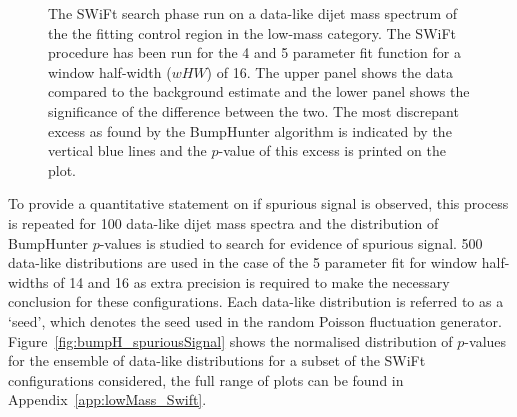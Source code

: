 \begin{figure}[!htb]
\caption{\label{fig:bhFit_lm_corrFitCR_dataLike}
  The SWiFt search phase run on a data-like dijet mass spectrum of the the fitting control region in the low-mass category.
  The SWiFt procedure has been run for the 4 and 5 parameter fit function for a window half-width ($wHW$) of 16.
  The upper panel shows the data compared to the background estimate and the lower panel shows the significance of the difference between the two.
  The most discrepant excess as found by the {\sc BumpHunter} algorithm is indicated by the vertical blue lines and the \mbox{$p$-value} of this excess is printed on the plot. 
}
\end{figure}

To provide a quantitative statement on if spurious signal is observed,
this process is repeated for 100 data-like dijet mass spectra and the distribution of {\sc BumpHunter} \mbox{$p$-value}s is studied to search for evidence of spurious signal.
500 data-like distributions are used in the case of the 5 parameter fit for window half-widths of 14 and 16
as extra precision is required to make the necessary conclusion for these configurations.
Each data-like distribution is referred to as a `seed', which denotes the seed used in the random Poisson fluctuation generator.
Figure~\ref{fig:bumpH_spuriousSignal} shows the normalised distribution of \mbox{$p$-value}s for the ensemble of data-like distributions
for a subset of the SWiFt configurations considered, the full range of plots can be found in Appendix~\ref{app:lowMass_Swift}.

